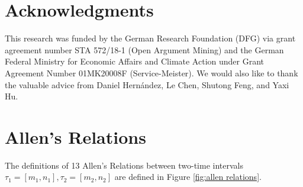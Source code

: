 \documentclass[letterpaper]{article} %
\begin{document}
\section*{Acknowledgments}
This research was funded by the German Research Foundation (DFG) via grant agreement number STA 572/18-1 (Open Argument Mining) and the German Federal Ministry for Economic Affairs and Climate Action under Grant Agreement Number 01MK20008F (Service-Meister). We would also like to thank the valuable advice from Daniel Hernández, Le Chen, Shutong Feng, and Yaxi Hu.



\clearpage



\clearpage
\appendix

\section{Allen's Relations}
\label{Allen's Relations}
The definitions of 13 Allen’s Relations between two-time intervals $\tau_1=[m_1,n_1], \tau_2=[m_2,n_2]$ are defined in Figure \ref{fig:allen relations}.
\end{document}
